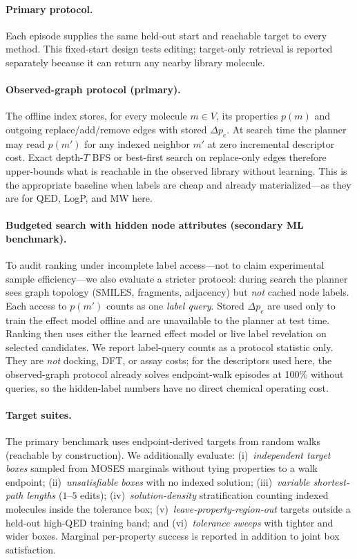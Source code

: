 \paragraph{Primary protocol.}
Each episode supplies the same held-out start and reachable target to every method. This fixed-start design tests editing; target-only retrieval is reported separately because it can return any nearby library molecule.

\paragraph{Observed-graph protocol (primary).}
The offline index stores, for every molecule $m\in V$, its properties $p(m)$ and outgoing replace/add/remove edges with stored $\Delta p_e$. At search time the planner may read $p(m')$ for any indexed neighbor $m'$ at zero incremental descriptor cost. Exact depth-$T$ BFS or best-first search on replace-only edges therefore upper-bounds what is reachable in the observed library without learning. This is the appropriate baseline when labels are cheap and already materialized---as they are for QED, LogP, and MW here.

\paragraph{Budgeted search with hidden node attributes (secondary ML benchmark).}
To audit ranking under incomplete label access---not to claim experimental sample efficiency---we also evaluate a stricter protocol: during search the planner sees graph topology (SMILES, fragments, adjacency) but \emph{not} cached node labels. Each access to $p(m')$ counts as one \emph{label query}. Stored $\Delta p_e$ are used only to train the effect model offline and are unavailable to the planner at test time. Ranking then uses either the learned effect model or live label revelation on selected candidates. We report label-query counts as a protocol statistic only. They are \emph{not} docking, DFT, or assay costs; for the descriptors used here, the observed-graph protocol already solves endpoint-walk episodes at 100\% without queries, so the hidden-label numbers have no direct chemical operating cost.

\paragraph{Target suites.}
The primary benchmark uses endpoint-derived targets from random walks (reachable by construction). We additionally evaluate: (i)~\emph{independent target boxes} sampled from MOSES marginals without tying properties to a walk endpoint; (ii)~\emph{unsatisfiable boxes} with no indexed solution; (iii)~\emph{variable shortest-path lengths} ($1$--$5$ edits); (iv)~\emph{solution-density} stratification counting indexed molecules inside the tolerance box; (v)~\emph{leave-property-region-out} targets outside a held-out high-QED training band; and (vi)~\emph{tolerance sweeps} with tighter and wider boxes. Marginal per-property success is reported in addition to joint box satisfaction.


